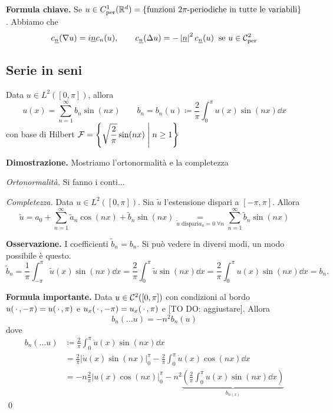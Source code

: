 \textbf{Formula chiave.}
Se $u \in C_{\text{per}}^1 (\mathbb R^d) = \left\{ \text{funzioni $2\pi$-periodiche in tutte le variabili} \right\}$. Abbiamo che
%
$$
	c_{\underline{n}} (\nabla u) = i \underline{n} c_n(u), \qquad 
	c_{\underline{n}} (\Delta u) = - \left| \underline{n} \right|^2 c_{\underline{n}} (u) \;\; \text{se }  u \in \mathcal{C}_{\text{per}}^2
$$
%

\subsection{Serie in seni}

Data $u \in L^2([0,\pi])$, allora 
%
$$
	u(x) = \sum_{n=1}^\infty b_n \sin(nx) \qquad 
	b_n = b_n(u) \coloneqq  \frac{2}{\pi} \int_0^\pi u(x) \sin(nx) \dd x
$$
%
con base di Hilbert $\displaystyle \mathcal{F} = \left\{ \sqrt{\frac{2}{\pi}} \sin(nx) \;\middle|\; n \geq 1 \right\}$

\textbf{Dimostrazione.} Mostriamo l'ortonormalità e la completezza

\textit{Ortonormalità.} Si fanno i conti...

\textit{Completezza.} Data $u \in L^2([0,\pi])$. Sia $\tilde{u}$ l'estensione dispari a $[-\pi,\pi]$. Allora 
%
$$
	\tilde{u} = a_0 + \sum_{n=1}^{\infty} \tilde{a}_n \cos(nx) + \tilde{b}_n \sin(nx)
	\underset{\tilde{u} \text{ dispari}  a_n = 0 \; \forall n} = \sum_{n=1}^{\infty} \tilde{b}_n \sin(nx)
$$
%

\textbf{Osservazione.} I coefficienti $\tilde{b}_n = b_n$. Si può vedere in diversi modi, un modo possibile è questo.
%
$$
	\tilde{b}_n = \frac{1}{\pi} \int_{-\pi}^{\pi} \tilde{u}(x) \sin(nx) \dd x 
	= \frac{2}{\pi} \int_{0}^{\pi} \tilde{u} \sin(nx) \dd x 
	= \frac{2}{\pi} \int_{0}^{\pi} u(x) \sin(nx) \dd x 
	= b_n.
$$
%

\textbf{Formula importante.} Data $u \in \mathcal{C}^2 ([0,\pi])$ con condizioni al bordo $u(\,\cdot\,, -\pi) = u(\,\cdot\,, \pi)$ e $u_x(\,\cdot\,, -\pi) = u_x(\,\cdot\,, \pi)$ e [TO DO: aggiustare].
Allora
%
$$
	b_n(\dots u) = -n^2 b_n(u)
$$
%
dove 
\begin{align*}
	b_n(\dots u) & \coloneqq \frac{2}{\pi} \int_0^\pi \ddot u(x) \sin(nx) \dd x \\
	& = \frac{2}{\pi} \left| \dot u(x) \sin(nx) \right|_0^\pi - \frac{2}{\pi} \int_{0}^{\pi} \dot u(x) \cos(nx) \dd x \\
	& = -n \frac{2}{\pi} \left| u(x) \cos(nx) \right|_0^\pi - n^2  \underbrace{\left( \frac{2}{\pi} \int_{0}^{\pi} u(x) \sin(nx) \dd x \right)}_{b_{n(x)}}
\end{align*}
\qed

